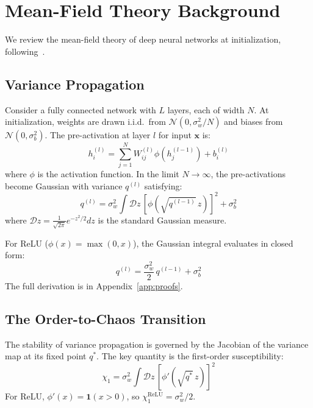 \documentclass[10pt]{article}
\begin{document}
\section{Mean-Field Theory Background}
\label{sec:mft}

We review the mean-field theory of deep neural networks at initialization, following~\cite{poole2016exponential,schoenholz2017deep}.

\subsection{Variance Propagation}

Consider a fully connected network with $L$ layers, each of width $N$.
At initialization, weights are drawn i.i.d.\ from $\mathcal{N}(0, \sigma_w^2/N)$ and biases from $\mathcal{N}(0, \sigma_b^2)$.
The pre-activation at layer $l$ for input $\mathbf{x}$ is:
\begin{equation}
    h_i^{(l)} = \sum_{j=1}^{N} W_{ij}^{(l)} \phi(h_j^{(l-1)}) + b_i^{(l)}
\end{equation}
where $\phi$ is the activation function.
In the limit $N \to \infty$, the pre-activations become Gaussian with variance $q^{(l)}$ satisfying:
\begin{equation}
    q^{(l)} = \sigma_w^2 \int \mathcal{D}z\, [\phi(\sqrt{q^{(l-1)}}\, z)]^2 + \sigma_b^2
    \label{eq:variance-map}
\end{equation}
where $\mathcal{D}z = \frac{1}{\sqrt{2\pi}} e^{-z^2/2} dz$ is the standard Gaussian measure.

For ReLU ($\phi(x) = \max(0,x)$), the Gaussian integral evaluates in closed form:
\begin{equation}
    q^{(l)} = \frac{\sigma_w^2}{2}\, q^{(l-1)} + \sigma_b^2
    \label{eq:relu-variance}
\end{equation}
The full derivation is in Appendix~\ref{app:proofs}.

\subsection{The Order-to-Chaos Transition}

The stability of variance propagation is governed by the Jacobian of the variance map at its fixed point $q^*$.
The key quantity is the first-order susceptibility:
\begin{equation}
    \chi_1 = \sigma_w^2 \int \mathcal{D}z\, [\phi'(\sqrt{q^*}\, z)]^2
    \label{eq:chi1}
\end{equation}
For ReLU, $\phi'(x) = \mathbf{1}(x > 0)$, so $\chi_1^{\text{ReLU}} = \sigma_w^2/2$.
\end{document}
